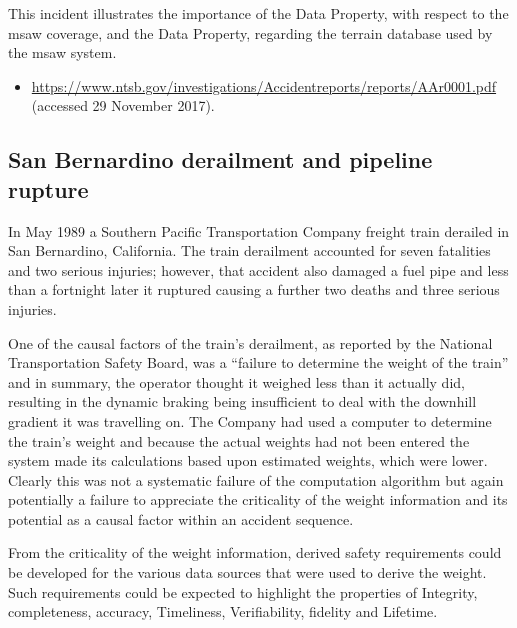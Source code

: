 This incident illustrates the importance of the Data Property, with respect to the \gls{msaw} coverage, and the  Data Property,
regarding
the terrain \gls{database} used by the \gls{msaw} system.

\begin{samepage}
\begin{itemize}
	\item \raggedright{\href{https://www.ntsb.gov/investigations/Accidentreports/reports/AAr0001.pdf}{https://www.ntsb.gov/investigations/Accidentreports/reports/AAr0001.pdf} (accessed 29 November 2017).}
\end{itemize}
\end{samepage}

\subsection{San Bernardino derailment and pipeline rupture} \label{bkm:incacc:sanbernardino}
In May 1989 a Southern Pacific Transportation Company freight train derailed in San Bernardino, California. The train derailment accounted for seven fatalities and two serious injuries; however, that accident also damaged a fuel pipe and less than a fortnight later it ruptured causing a further two deaths and three serious injuries.

One of the causal factors of the train’s derailment, as reported by the National Transportation Safety Board, was a ``failure to determine the weight of the train'' and in summary, the operator thought it weighed less than it actually did, resulting in the dynamic braking being insufficient to deal with the downhill gradient it was travelling on. The Company had used a computer to determine the train’s weight and because the actual weights had not been entered the system made its calculations based upon estimated weights, which were lower. Clearly this was not a systematic failure of the computation algorithm but again potentially a failure to appreciate the \gls{criticality} of the weight information and its potential as a causal factor within an accident sequence.

From the \gls{criticality} of the weight information, derived safety requirements could be developed for the various data sources that were used to derive the weight. Such requirements could be expected to highlight the properties of Integrity, \gls{completeness}, \gls{accuracy}, Timeliness, Verifiability, \gls{fidelity} and Lifetime.

